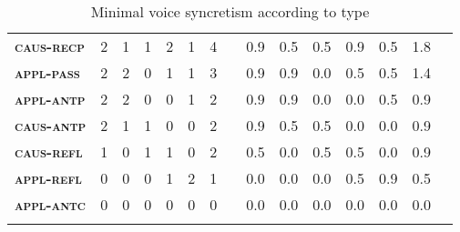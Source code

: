 \begin{table}
\begin{tabularx}{\textwidth}{lrrrrrrlrrrrrrl}
		\textbf{\textsc{caus-recp}} & 2 & 1 & 1 & 2 & 1 & 4 & & 0.9 & 0.5 & 0.5 & 0.9 & 0.5 & 1.8 & \\
		\textbf{\textsc{appl-pass}} & 2 & 2 & 0 & 1 & 1 & 3 & & 0.9 & 0.9 & 0.0 & 0.5 & 0.5 & 1.4 & \\
		\textbf{\textsc{appl-antp}} & 2 & 2 & 0 & 0 & 1 & 2 & & 0.9 & 0.9 & 0.0 & 0.0 & 0.5 & 0.9 & \\
		\textbf{\textsc{caus-antp}} & 2 & 1 & 1 & 0 & 0 & 2 & & 0.9 & 0.5 & 0.5 & 0.0 & 0.0 & 0.9 & \\
		\textbf{\textsc{caus-refl}} & 1 & 0 & 1 & 1 & 0 & 2 & & 0.5 & 0.0 & 0.5 & 0.5 & 0.0 & 0.9 & \\
		\textbf{\textsc{appl-refl}} & 0 & 0 & 0 & 1 & 2 & 1 & & 0.0 & 0.0 & 0.0 & 0.5 & 0.9 & 0.5 & \\
		\textbf{\textsc{appl-antc}} & 0 & 0 & 0 & 0 & 0 & 0 & & 0.0 & 0.0 & 0.0 & 0.0 & 0.0 & 0.0 & \\
		\lspbottomrule
	\end{tabularx}
	\caption{Minimal voice syncretism according to type}
	\label{tab:ch6:voice-syncretism-simplex}
\end{table} 

